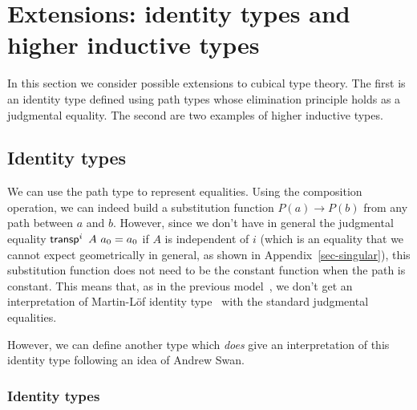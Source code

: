 \section{Extensions: identity types and higher inductive types}
\label{sec:extensions}

In this section we consider possible extensions to cubical type
theory. The first is an identity type defined using path types whose
elimination principle holds as a judgmental equality. The
second are two examples of higher inductive types.

\subsection{Identity types}\label{sec:identitytypes}

We can use the path type to represent equalities. Using the
composition operation, we can indeed build a substitution function
$P(a) \rightarrow P(b)$ from any path between $a$ and $b$. However,
since we don't have in general the judgmental equality
$\operatorname{\mathsf{transp}}^i~A~a_0 = a_0$ if $A$ is independent of $i$ (which is an
equality that we cannot expect geometrically in general, as shown in
Appendix~\ref{sec-singular}), this substitution function does not need to be the
constant function when the path is constant. This means that, as in
the previous model~\cite{BCH,simonlic}, we don't get an interpretation
of Martin-L\"of identity type~\cite{ML75} with the standard judgmental
equalities.

However, we can define another type which {\em does} give an
interpretation of this identity type following an idea of Andrew Swan.

\subsubsection*{Identity types}

